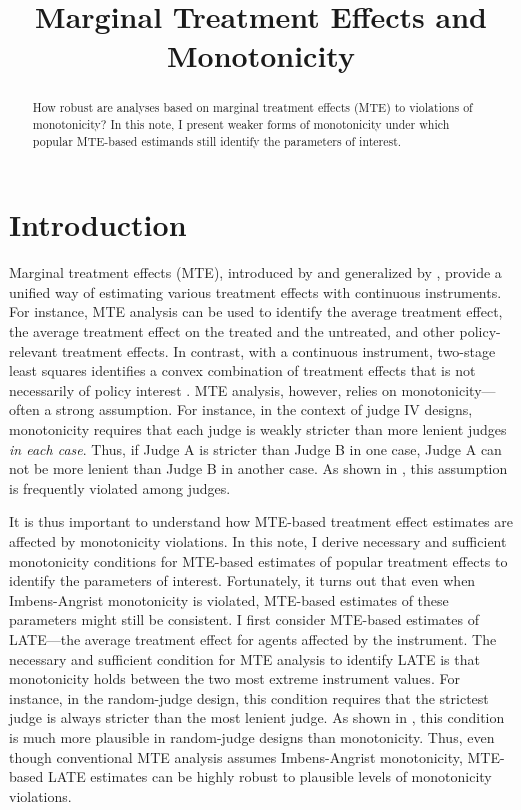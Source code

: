 
\title{Marginal Treatment Effects and Monotonicity}
\maketitle
\begin{abstract}
How robust are analyses based on marginal treatment effects (MTE)
to violations of \citet{Imbens1994Identification} monotonicity? In
this note, I present weaker forms of monotonicity under which popular
MTE-based estimands still identify the parameters of interest.
\end{abstract}

\section{Introduction}

Marginal treatment effects (MTE), introduced by \citet{bjorklund1987estimation}
and generalized by \citet{heckman1999local,heckman2005structural},
provide a unified way of estimating various treatment effects with
continuous instruments. For instance, MTE analysis can be used to
identify the average treatment effect, the average treatment effect
on the treated and the untreated, and other policy-relevant treatment
effects. In contrast, with a continuous instrument, two-stage least
squares identifies a convex combination of treatment effects that
is not necessarily of policy interest \citep{heckman2007econometricII}.
MTE analysis, however, relies on \citet{Imbens1994Identification}
monotonicity---often a strong assumption. For instance, in the context
of judge IV designs, \citet{Imbens1994Identification} monotonicity
requires that each judge is weakly stricter than more lenient judges
\emph{in each case}. Thus, if Judge A is stricter than Judge B in
one case, Judge A can not be more lenient than Judge B in another
case. As shown in \citet{sigstad2023monotonicity}, this assumption
is frequently violated among judges.

It is thus important to understand how MTE-based treatment effect
estimates are affected by monotonicity violations. In this note, I
derive necessary and sufficient monotonicity conditions for MTE-based
estimates of popular treatment effects to identify the parameters
of interest. Fortunately, it turns out that even when Imbens-Angrist
monotonicity is violated, MTE-based estimates of these parameters
might still be consistent. I first consider MTE-based estimates of
LATE---the average treatment effect for agents affected by the instrument.
The necessary and sufficient condition for MTE analysis to identify
LATE is that monotonicity holds between the two most extreme instrument
values. For instance, in the random-judge design, this condition requires
that the strictest judge is always stricter than the most lenient
judge. As shown in \citet{sigstad2023monotonicity}, this condition
is much more plausible in random-judge designs than \citet{Imbens1994Identification}
monotonicity. Thus, even though conventional MTE analysis assumes
Imbens-Angrist monotonicity, MTE-based LATE estimates can be highly
robust to plausible levels of monotonicity violations.

